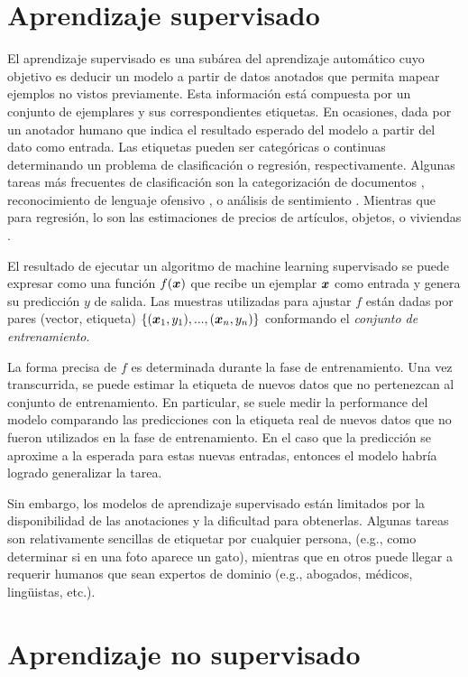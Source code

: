 \section{Aprendizaje supervisado}

El aprendizaje supervisado es una subárea del aprendizaje automático cuyo
objetivo es deducir un modelo a partir de datos anotados que permita mapear
ejemplos no vistos previamente. Esta información está compuesta por un conjunto
de ejemplares y sus correspondientes etiquetas. En ocasiones, dada por un
anotador humano que indica el resultado esperado del modelo a partir del dato
como entrada. Las etiquetas pueden ser categóricas o continuas determinando un
problema de clasificación o regresión, respectivamente. Algunas tareas más
frecuentes de clasificación son la categorización de documentos
\citep{lulu-2019}, reconocimiento de lenguaje ofensivo \citep{bencheng-2021}, o
análisis de sentimiento \citep{Nhan-2020}. Mientras que para regresión, lo son
las estimaciones de precios de artículos, objetos, o viviendas \citep{Yeh-2011}.

El resultado de ejecutar un algoritmo de machine learning supervisado se puede
expresar como una función $f(\boldsymbol{x})$ que recibe un ejemplar $\boldsymbol{x}$ como
entrada y genera su predicción $y$ de salida. Las muestras utilizadas para
ajustar $f$ están dadas por pares (vector, etiqueta) $\{(\boldsymbol{x}_1, y_1), ...,
(\boldsymbol{x}_n, y_n)\}$ conformando el \emph{conjunto de entrenamiento}.

La forma precisa de $f$ es determinada durante la fase de entrenamiento. Una vez
transcurrida, se puede estimar la etiqueta de nuevos datos que no pertenezcan al
conjunto de entrenamiento. En particular, se suele medir la performance del
modelo comparando las predicciones con la etiqueta real de nuevos datos que no
fueron utilizados en la fase de entrenamiento. En el caso que la
predicción se aproxime a la esperada para estas nuevas entradas, entonces el
modelo habría logrado generalizar la tarea.

Sin embargo, los modelos de aprendizaje supervisado están limitados por la
disponibilidad de las anotaciones y la dificultad para obtenerlas. Algunas
tareas son relativamente sencillas de etiquetar por cualquier persona, (e.g.,
como determinar si en una foto aparece un gato), mientras que en otros puede
llegar a requerir humanos que sean expertos de dominio (e.g., abogados, médicos,
lingüistas, etc.).

\section{Aprendizaje no supervisado}

